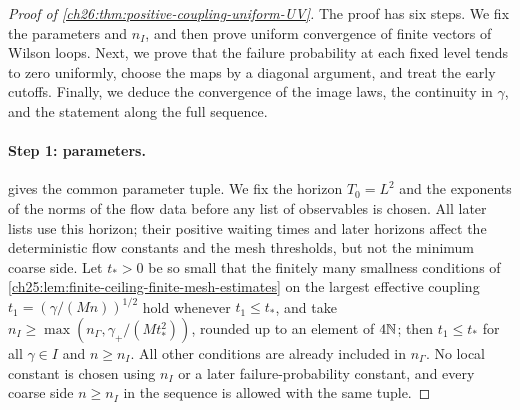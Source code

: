 \begin{proof}[Proof of \cref{ch26:thm:positive-coupling-uniform-UV}]
The proof has six steps. We fix the parameters and $n_I$, and then prove uniform convergence of finite vectors of Wilson loops. Next, we prove that the failure probability at each fixed level tends to zero uniformly, choose the maps by a diagonal argument, and treat the early cutoffs. Finally, we deduce the convergence of the image laws, the continuity in $\gamma$, and the statement along the full sequence.

\paragraph{Step 1: parameters.}
 gives the common parameter tuple. We fix the horizon $T_0=L^2$ and the exponents of the norms of the flow data before any list of observables is chosen. All later lists use this horizon; their positive waiting times and later horizons affect the deterministic flow constants and the mesh thresholds, but not the minimum coarse side. Let $t_*>0$ be so small that the finitely many smallness conditions of \cref{ch25:lem:finite-ceiling-finite-mesh-estimates} on the largest effective coupling $t_1=(\gamma/(Mn))^{1/2}$ hold whenever $t_1\le t_*$, and take $n_I\ge\max(n_\Gamma,\gamma_+/(Mt_*^2))$, rounded up to an element of $4\mathbb N$; then $t_1\le t_*$ for all $\gamma\in I$ and $n\ge n_I$. All other conditions are already included in $n_\Gamma$. No local constant is chosen using $n_I$ or a later failure-probability constant, and every coarse side $n\ge n_I$ in the sequence is allowed with the same tuple.


\end{proof}
